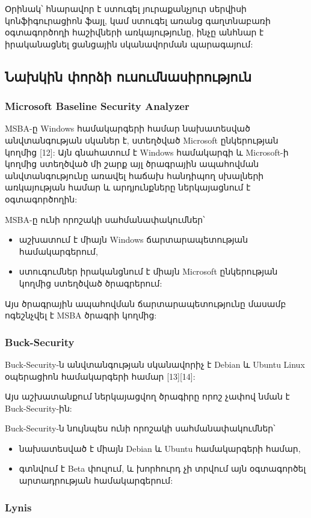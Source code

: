 \documentclass[a4paper,12pt]{article}
\begin{document}
\begin{sloppypar}
Օրինակ՝ հնարավոր է ստուգել յուրաքանչյուր սերվիսի կոնֆիգուրացիոն ֆայլ,
կամ ստուգել առանց գաղտնաբառի օգտագործողի հաշիվների առկայությունը,
ինչը անհնար է իրականացնել ցանցային սկանավորման պարագայում:


\subsection{Նախկին փորձի ուսումնասիրություն}


\subsubsection{Microsoft Baseline Security Analyzer}


MSBA-ը Windows համակարգերի համար նախատեսված անվտանգության սկաներ է,
ստեղծված Microsoft ընկերության կողմից [12]: Այն գնահատում է Windows
համակարգի և Microsoft-ի կողմից ստեղծված մի շարք այլ ծրագրային ապահովման
անվտանգությունը առավել հաճախ հանդիպող սխալների առկայության համար և արդյունքները 
ներկայացնում է օգտագործողին:

MSBA-ը ունի որոշակի սահմանափակումներ՝
\begin{itemize}
\item աշխատում է միայն Windows ճարտարապետության համակարգերում,
\item ստուգումներ իրականցնում է միայն Microsoft ընկերության
	կողմից ստեղծված ծրագրերում:
\end{itemize}

Այս ծրագրային ապահովման ճարտարապետությունը մասամբ ոգեշնչվել է
MSBA ծրագրի կողմից:


\subsubsection{Buck-Security}


Buck-Security-ն անվտանգության սկանավորիչ է Debian և Ubuntu Linux
օպերացիոն համակարգերի համար [13][14]:

Այս աշխատանքում ներկայացվող ծրագիրը որոշ չափով նման է Buck-Security-ին:

Buck-Security-ն նույնպես ունի որոշակի սահմանափակումներ՝
\begin{itemize}
\item նախատեսված է միայն Debian և Ubuntu համակարգերի համար,
\item գտնվում է Beta փուլում, և խորհուրդ չի տրվում այն օգտագործել
	արտադրության համակարգերում:
\end{itemize}


\subsubsection{Lynis}



\end{sloppypar}
\end{document}
